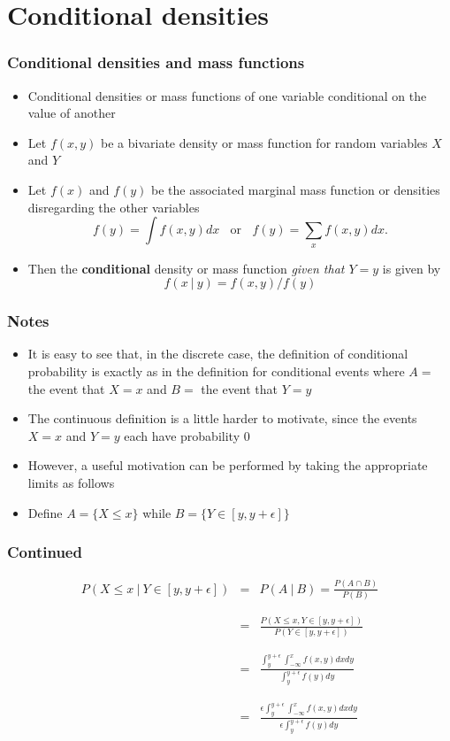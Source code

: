 \documentclass[aspectratio=169]{beamer}
\begin{document}
\section{Conditional densities}
\begin{frame}\frametitle{Conditional densities and mass functions} 
\begin{itemize}
\item Conditional densities or mass functions of one variable conditional on
  the value of another
\item Let $f(x,y)$ be a bivariate density or mass function for random variables
$X$ and $Y$
\item Let $f(x)$ and $f(y)$ be the associated marginal mass function
  or densities disregarding the other variables
$$
f(y) = \int f(x, y)dx ~~~~\mbox{or}~~~~ f(y) = \sum_x f(x, y) dx.
$$
\item Then the {\bf conditional} density or mass function {\em given that $Y = y$} is given by
$$
f(x ~|~ y) = f(x, y) / f(y)
$$
\end{itemize}
\end{frame}

\begin{frame}\frametitle{Notes}
\begin{itemize}
\item It is easy to see that, in the discrete case, the definition of
  conditional probability is exactly as in the definition for
  conditional events where $A = $ the event that $X = x$ and $B = $
  the event that $Y = y$
\item The continuous definition is a little harder to motivate, since
  the events $X = x$ and $Y = y$ each have probability 0
\item However, a useful motivation can be performed by taking the
  appropriate limits as follows
\item Define $A = \{X \leq x\}$ while $B = \{Y \in [y, y + \epsilon]\}$
\end{itemize}
\end{frame}

\begin{frame}
\frametitle{Continued}
\begin{eqnarray*} 
P(X \leq x ~|~ Y \in [y, y + \epsilon]) & = & P(A ~|~ B) = \frac{P(A \cap B)}{P(B)} \\ \\  \\
& = & \frac{P(X \leq x, Y \in [y, y + \epsilon])}{P(Y \in [y, y + \epsilon])} \\ \\ \\
& = & \frac{\int_{y}^{y+\epsilon}\int_{-\infty}^{x}f(x,y)dxdy}
           {\int_{y}^{y+\epsilon} f(y) dy} \\ \\ \\
& = &  \frac{\epsilon\int_{y}^{y+\epsilon}\int_{-\infty}^{x}f(x,y)dxdy}
           {\epsilon\int_{y}^{y+\epsilon} f(y) dy} 
\end{eqnarray*}
\end{frame}
\end{document}

